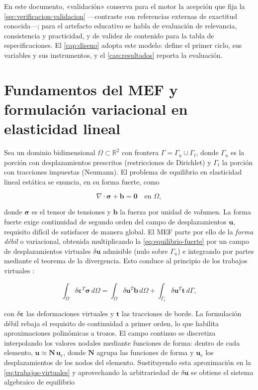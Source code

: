 En este documento, «validación» conserva para el motor la acepción que fija la \autoref{sec:verificacion-validacion} —contraste con referencias externas de exactitud conocida—; para el artefacto educativo se habla de evaluación de relevancia, consistencia y practicidad, y de validez de contenido para la tabla de especificaciones. El \autoref{cap:diseno} adopta este modelo: define el primer ciclo, sus variables y sus instrumentos, y el \autoref{cap:resultados} reporta la evaluación.

\section{Fundamentos del MEF y formulación variacional en elasticidad lineal}
\label{sec:formulacion-debil}

Sea un dominio bidimensional $\Omega \subset \mathbb{R}^2$ con frontera $\Gamma = \Gamma_u \cup \Gamma_t$, donde $\Gamma_u$ es la porción con desplazamientos prescritos (restricciones de Dirichlet) y $\Gamma_t$ la porción con tracciones impuestas (Neumann). El problema de equilibrio en elasticidad lineal estática se enuncia, en su forma fuerte, como

\begin{equation}
\nabla \cdot \bm{\sigma} + \bm{b} = \bm{0} \quad \text{en } \Omega,
\label{eq:equilibrio-fuerte}
\end{equation}

donde $\bm{\sigma}$ es el tensor de tensiones y $\bm{b}$ la fuerza por unidad de volumen. La forma fuerte exige continuidad de segundo orden del campo de desplazamientos $\bm{u}$, requisito difícil de satisfacer de manera global. El MEF parte por ello de la \emph{forma débil} o variacional, obtenida multiplicando la \autoref{eq:equilibrio-fuerte} por un campo de desplazamientos virtuales $\delta\bm{u}$ admisible (nulo sobre $\Gamma_u$) e integrando por partes mediante el teorema de la divergencia. Esto conduce al principio de los trabajos virtuales \autocites[pp.~69-71]{zienkiewicz2013fem}[pp.~77-79]{hughes2000fem}[pp.~612-613]{reddy2006introduction}:

\begin{equation}
\int_\Omega \delta\bm{\varepsilon}^{T} \bm{\sigma} \, d\Omega
= \int_\Omega \delta\bm{u}^{T} \bm{b} \, d\Omega
+ \int_{\Gamma_t} \delta\bm{u}^{T} \bm{t} \, d\Gamma,
\label{eq:trabajos-virtuales}
\end{equation}

con $\delta\bm{\varepsilon}$ las deformaciones virtuales y $\bm{t}$ las tracciones de borde. La formulación débil rebaja el requisito de continuidad a primer orden, lo que habilita aproximaciones polinómicas a trozos. El campo continuo se discretiza interpolando los valores nodales mediante funciones de forma: dentro de cada elemento, $\bm{u} \approx \bm{N}\,\bm{u}_e$, donde $\bm{N}$ agrupa las funciones de forma y $\bm{u}_e$ los desplazamientos de los nodos del elemento. Sustituyendo esta aproximación en la \autoref{eq:trabajos-virtuales} y aprovechando la arbitrariedad de $\delta\bm{u}$ se obtiene el sistema algebraico de equilibrio

